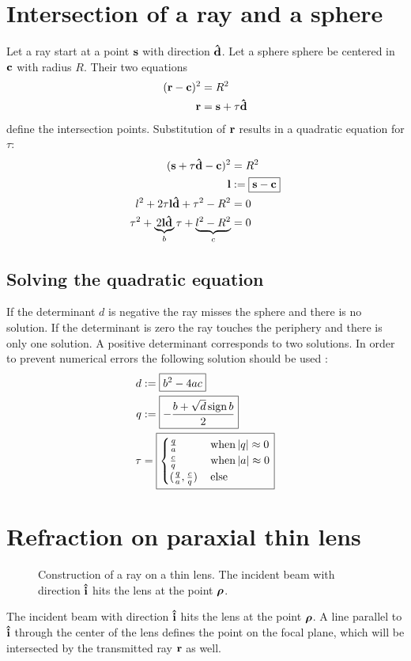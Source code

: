 \section{Intersection of a ray and a sphere}
Let a ray start at a point $\mathbf{s}$ with direction $\mathbf{\hat{d}}$.  Let a sphere
sphere be centered in $\mathbf{c}$ with radius $R$. Their two equations
\begin{align}
  (\mathbf{r}-\mathbf{c})^2&=R^2\\
  \mathbf{r}&=\mathbf{s}+\tau\mathbf{\hat{d}}
\end{align}
define the intersection points. Substitution of $\mathbf{r}$ results in a
quadratic equation for $\tau$:
\begin{align}
  (\mathbf{s}+\tau\mathbf{\hat{d}}-\mathbf{c})^2&=R^2\\
  \mathbf{l}&:=\boxed{\mathbf{s}-\mathbf{c}}\\
  l^2+2\tau\mathbf{l}\mathbf{\hat{d}}+\tau^2-R^2&=0\\
  \tau^2+\underbrace{2\mathbf{l}\mathbf{\hat{d}}}_b\tau+\underbrace{l^2-R^2}_c&=0
\end{align}
\subsection{Solving the quadratic equation}
If the determinant $d$ is negative the ray misses the sphere and there
is no solution. If the determinant is zero the ray touches the
periphery and there is only one solution. A positive determinant
corresponds to two solutions. In order to prevent numerical errors the following solution should be used \citep{Press1997}: 
\begin{align}
  d&:=\boxed{b^2-4ac}\\
  q&:=\boxed{-\frac{b+\sqrt{d}\operatorname{sign} b}{2}}\\
  \tau&=\boxed{
  \begin{cases}
    \frac{q}{a} &\,\textrm{when}\,\mathopen| q \mathclose|\approx 0\\ 
    \frac{c}{q} &\,\textrm{when}\,\mathopen| a \mathclose|\approx 0\\
    (\frac{q}{a}, \frac{c}{q}) &\,\textrm{else}
  \end{cases}}
\end{align}
\section{Refraction on paraxial thin lens}
\begin{figure}[!hbt]
  \centering
  
  \caption{Construction of a ray on a thin lens. The incident beam
    with direction $\mathbf{\hat{i}}$ hits the lens at the point $\boldsymbol\rho$.}
\end{figure}
The incident beam with direction $\mathbf{\hat{i}}$ hits the lens at the point
$\boldsymbol\rho$. A line parallel to $\mathbf{\hat{i}}$ through the center of the lens
defines the point on the focal plane, which will be intersected by the
transmitted ray $\mathbf{r}$ as well.

